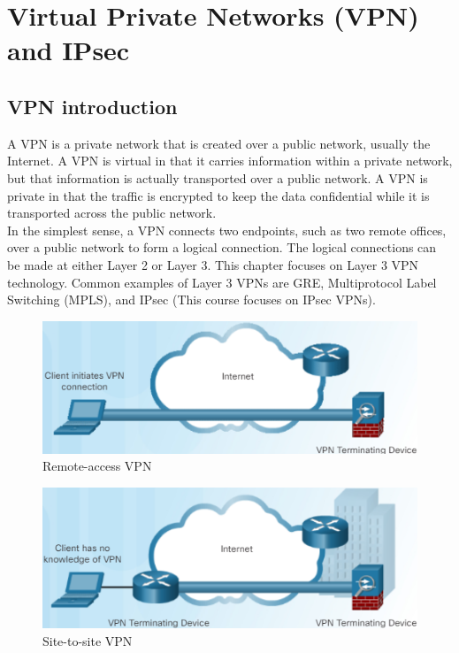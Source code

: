 \chapter{Virtual Private Networks (VPN) and IPsec}

\section{VPN introduction}

A VPN is a private network that is created over a public network, usually the Internet. A VPN is virtual in that it carries information within a private network, but that information is actually transported over a public network. A VPN is private in that the traffic is encrypted to keep the data confidential while it is transported across the public network.\\

In the simplest sense, a VPN connects two endpoints, such as two remote offices, over a public network to form a logical connection. The logical connections can be made at either Layer 2 or Layer 3. This chapter focuses on Layer 3 VPN technology. Common examples of Layer 3 VPNs are GRE, Multiprotocol Label Switching (MPLS), and IPsec (This course focuses on IPsec VPNs).\\

\begin{figure}[hbtp]
\caption{Remote-access VPN}\label{RemoteVPN}
\centering
\includegraphics[scale=1]{pictures/RemoteVPN.PNG}
\end{figure}

\begin{figure}[hbtp]
\caption{Site-to-site VPN}\label{Site2site}
\centering
\includegraphics[scale=1]{pictures/Site2site.PNG}
\end{figure}


